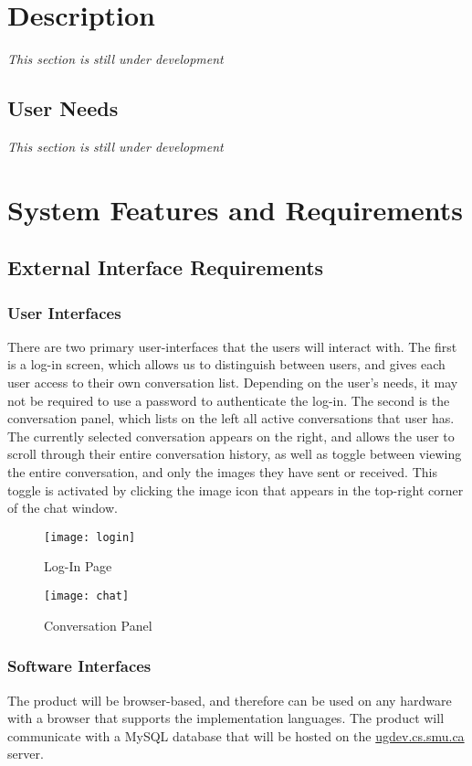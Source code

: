 \documentclass[11pt]{article}
\begin{document}
\section{Description}
\textit{This section is still under development}
\subsection{User Needs}
\textit{This section is still under development}
\section{System Features and Requirements}
\subsection{External Interface Requirements}
\subsubsection{User Interfaces}
There are two primary user-interfaces that the users will interact with. The first is a log-in
screen, which allows us to distinguish between users, and gives each user access to their own
conversation list. Depending on the user's needs, it may not be required to use a password to
authenticate the log-in. The second is the conversation panel, which lists on the left all active
conversations that user has. The currently selected conversation appears on the right, and allows
the user to scroll through their entire conversation history, as well as toggle between viewing the
entire conversation, and only the images they have sent or received. This toggle is activated by
clicking the image icon that appears in the top-right corner of the chat window.

\begin{figure}[!htb]
  \texttt{[image: login]}
  \caption{Log-In Page}
\end{figure}
\begin{figure}
    \texttt{[image: chat]}
    \caption{Conversation Panel}
\end{figure}
\FloatBarrier

\subsubsection{Software Interfaces}
The product will be browser-based, and therefore can be used on any hardware with a browser that
supports the implementation languages. The product will communicate with a MySQL database that will
be hosted on the \url{ugdev.cs.smu.ca} server.
\end{document}
